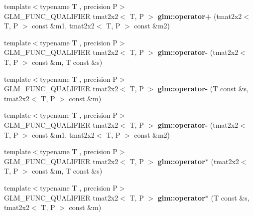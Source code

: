 \begin{DoxyCompactItemize}
\item 
\hypertarget{namespaceglm_aaba2f45dbfefdf70d0434dc7e1f5e664}{{\footnotesize template$<$typename T , precision P$>$ }\\G\-L\-M\-\_\-\-F\-U\-N\-C\-\_\-\-Q\-U\-A\-L\-I\-F\-I\-E\-R tmat2x2$<$ T, P $>$ {\bfseries glm\-::operator+} (tmat2x2$<$ T, P $>$ const \&m1, tmat2x2$<$ T, P $>$ const \&m2)}\label{namespaceglm_aaba2f45dbfefdf70d0434dc7e1f5e664}

\item 
\hypertarget{namespaceglm_a5714d191269fffee9f8210da088a1c5f}{{\footnotesize template$<$typename T , precision P$>$ }\\G\-L\-M\-\_\-\-F\-U\-N\-C\-\_\-\-Q\-U\-A\-L\-I\-F\-I\-E\-R tmat2x2$<$ T, P $>$ {\bfseries glm\-::operator-\/} (tmat2x2$<$ T, P $>$ const \&m, T const \&s)}\label{namespaceglm_a5714d191269fffee9f8210da088a1c5f}

\item 
\hypertarget{namespaceglm_a44fd3b02e7ef87b81118da12ba1ab113}{{\footnotesize template$<$typename T , precision P$>$ }\\G\-L\-M\-\_\-\-F\-U\-N\-C\-\_\-\-Q\-U\-A\-L\-I\-F\-I\-E\-R tmat2x2$<$ T, P $>$ {\bfseries glm\-::operator-\/} (T const \&s, tmat2x2$<$ T, P $>$ const \&m)}\label{namespaceglm_a44fd3b02e7ef87b81118da12ba1ab113}

\item 
\hypertarget{namespaceglm_a0d4974acd47ff586c5643bdf07de8a6d}{{\footnotesize template$<$typename T , precision P$>$ }\\G\-L\-M\-\_\-\-F\-U\-N\-C\-\_\-\-Q\-U\-A\-L\-I\-F\-I\-E\-R tmat2x2$<$ T, P $>$ {\bfseries glm\-::operator-\/} (tmat2x2$<$ T, P $>$ const \&m1, tmat2x2$<$ T, P $>$ const \&m2)}\label{namespaceglm_a0d4974acd47ff586c5643bdf07de8a6d}

\item 
\hypertarget{namespaceglm_ade55bbe062e1601d8426510e026e2975}{{\footnotesize template$<$typename T , precision P$>$ }\\G\-L\-M\-\_\-\-F\-U\-N\-C\-\_\-\-Q\-U\-A\-L\-I\-F\-I\-E\-R tmat2x2$<$ T, P $>$ {\bfseries glm\-::operator$\ast$} (tmat2x2$<$ T, P $>$ const \&m, T const \&s)}\label{namespaceglm_ade55bbe062e1601d8426510e026e2975}

\item 
\hypertarget{namespaceglm_aa7586349972bcef1ac08a6fa756477f9}{{\footnotesize template$<$typename T , precision P$>$ }\\G\-L\-M\-\_\-\-F\-U\-N\-C\-\_\-\-Q\-U\-A\-L\-I\-F\-I\-E\-R tmat2x2$<$ T, P $>$ {\bfseries glm\-::operator$\ast$} (T const \&s, tmat2x2$<$ T, P $>$ const \&m)}\label{namespaceglm_aa7586349972bcef1ac08a6fa756477f9}


\end{DoxyCompactItemize}
